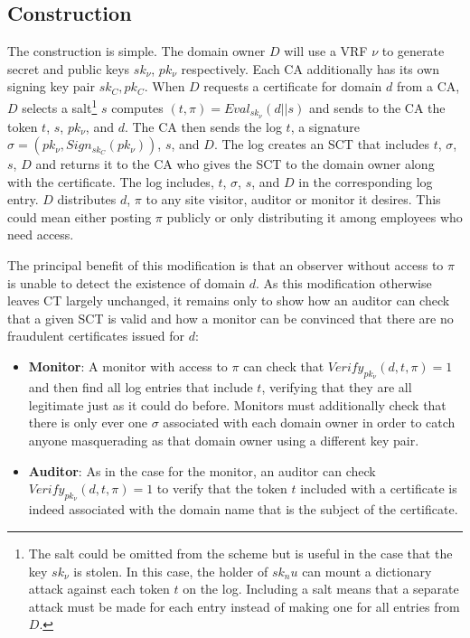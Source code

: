 \documentclass[letterpaper,twocolumn,10pt]{article}
\begin{document}
\subsection{Construction}
The construction is simple. The domain owner $D$ will use a VRF $\nu$ to generate secret and public keys $sk_\nu$, $pk_\nu$ respectively. Each CA additionally has its own signing key pair $sk_C, pk_C$. When $D$ requests a certificate for domain $d$ from a CA, $D$ selects a salt\footnote{The salt could be omitted from the scheme but is useful in the case that the key $sk_\nu$ is stolen. In this case, the holder of $sk_nu$ can mount a dictionary attack against each token $t$ on the log. Including a salt means that a separate attack must be made for each entry instead of making one for all entries from $D$.} $s$ computes $(t, \pi)=Eval_{sk_\nu}(d||s)$ and sends to the CA the token $t$, $s$, $pk_\nu$, and $d$. The CA then sends the log $t$, a signature $\sigma=(pk_\nu, Sign_{sk_C}(pk_\nu))$, $s$, and $D$. The log creates an SCT that includes $t$, $\sigma$, $s$, $D$ and returns it to the CA who gives the SCT to the domain owner along with the certificate. The log includes, $t$, $\sigma$, $s$, and $D$ in the corresponding log entry. $D$ distributes $d$, $\pi$ to any site visitor, auditor or monitor it desires. This could mean either posting $\pi$ publicly or only distributing it among employees who need access.

The principal benefit of this modification is that an observer without access to $\pi$ is unable to detect the existence of domain $d$. As this modification otherwise leaves CT largely unchanged, it remains only to show how an auditor can check that a given SCT is valid and how a monitor can be convinced that there are no fraudulent certificates issued for $d$:
\begin{itemize}
\item\textbf{Monitor}: A monitor with access to $\pi$ can check that $Verify_{pk_\nu}(d,t,\pi)=1$ and then find all log entries that include $t$, verifying that they are all legitimate just as it could do before. Monitors must additionally check that there is only ever one $\sigma$ associated with each domain owner in order to catch anyone masquerading as that domain owner using a different key pair.
\item\textbf{Auditor}: As in the case for the monitor, an auditor can check $Verify_{pk_\nu}(d,t,\pi)=1$ to verify that the token $t$ included with a certificate is indeed associated with the domain name that is the subject of the certificate. 
\end{itemize}
\end{document}
